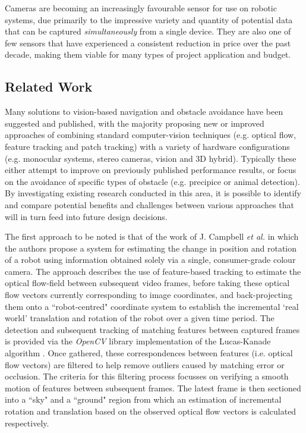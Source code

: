 Cameras are becoming an increasingly favourable sensor for use on robotic systems, due primarily to the impressive variety and quantity of potential data that can be captured \textit{simultaneously} from a single device. They are also one of few sensors that have experienced a consistent reduction in price over the past decade, making them viable for many types of project application and budget. 

\subsection{Related Work}

Many solutions to vision-based navigation and obstacle avoidance have been suggested and published, with the majority proposing new or improved approaches of combining standard computer-vision techniques (e.g. optical flow, feature tracking and patch tracking) with a variety of hardware configurations (e.g. monocular systems, stereo cameras, vision and 3D hybrid). Typically these either attempt to improve on previously published performance results, or focus on the avoidance of specific types of obstacle (e.g. precipice or animal detection). By investigating existing research conducted in this area, it is possible to identify and compare potential benefits and challenges between various approaches that will in turn feed into future design decisions.

The first approach to be noted is that of the work of J. Campbell \textit{et al.} \cite{campbell} in which the authors propose a system for estimating the change in position and rotation of a robot using information obtained solely via a single, consumer-grade colour camera. The approach describes the use of feature-based tracking to estimate the optical flow-field between subsequent video frames, before taking these optical flow vectors currently corresponding to image coordinates, and back-projecting them onto a ``robot-centred" coordinate system to establish the incremental `real world' translation and rotation of the robot over a given time period. The detection and subsequent tracking of matching features between captured frames is provided via the \textit{OpenCV} library implementation of the Lucas-Kanade algorithm \cite{opencv-lucas-kanade-features}. Once gathered, these correspondences between features (i.e. optical flow vectors) are filtered to help remove outliers caused by matching error or occlusion. The criteria for this filtering process focusses on verifying a smooth motion of features between subsequent frames. The latest frame is then sectioned into a ``sky" and a ``ground" region from which an estimation of incremental rotation and translation based on the observed optical flow vectors is calculated respectively.

